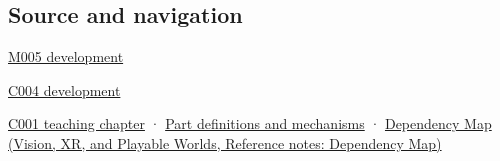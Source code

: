 \subsection{Source and navigation}\label{appendix-343615f49ddf-source-and-navigation}

\hypertarget{appendix-343615f49ddf-source-and-navigation}{}

\hyperref[01-foundations-i-ch001-when-arithmetic-meets-uncertainty]{M005 development}

\hyperref[01-foundations-i-ch001-a-stretching-ruler-for-real-valued-quantities]{C004 development}

\hyperref[01-foundations-i-ch001-from-a-signal-to-an-interpretation]{C001 teaching chapter} · \hyperref[appendix-fd090d982a15]{Part definitions and mechanisms} · \href{../07-Vision-XR-and-Playable-Worlds/main.pdf\#nameddest=appendix-4ad47bdd269a}{Dependency Map (Vision, XR, and Playable Worlds, Reference notes: Dependency Map)}
